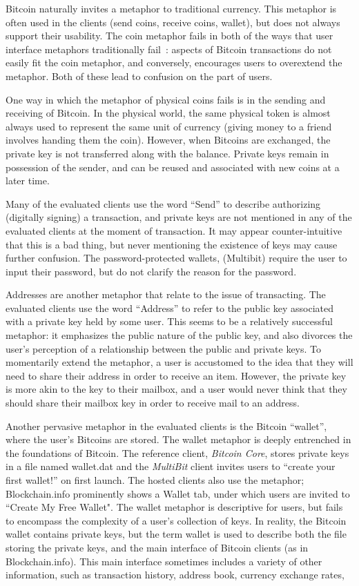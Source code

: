 Bitcoin naturally invites a metaphor to traditional currency. This metaphor is often used in the clients (\eg send coins, receive coins, wallet), but does not always support their usability. The coin metaphor fails in both of the ways that user interface metaphors traditionally fail~\cite{metaphorpaper}: aspects of Bitcoin transactions do not easily fit the coin metaphor, and conversely, encourages users to overextend the metaphor. Both of these lead to confusion on the part of users.   

One way in which the metaphor of physical coins fails is in the sending and receiving of Bitcoin. In the physical world, the same physical token is almost always used to represent the same unit of currency (\ie giving money to a friend involves handing them the coin). However, when Bitcoins are exchanged, the private key is not transferred along with the balance. Private keys remain in possession of the sender, and can be reused and associated with new coins at a later time. 

Many of the evaluated clients use the word ``Send'' to describe authorizing (digitally signing) a transaction, and private keys are not mentioned in any of the evaluated clients at the moment of transaction. It may appear counter-intuitive that this is a bad thing, but never mentioning the existence of keys may cause further confusion. The password-protected wallets, (\eg Multibit) require the user to input their password, but do not clarify the reason for the password.

Addresses are another metaphor that relate to the issue of transacting. The evaluated clients use the word ``Address'' to refer to the public key associated with a private key held by some user. This seems to be a relatively successful metaphor: it emphasizes the public nature of the public key, and also divorces the user's perception of a relationship between the public and private keys. To momentarily extend the metaphor, a user is accustomed to the idea that they will need to share their address in order to receive an item. However, the private key is more akin to the key to their mailbox, and a user would never think that they should share their mailbox key in order to receive mail to an address. 

Another pervasive metaphor in the evaluated clients is the Bitcoin ``wallet'', where the user's Bitcoins are stored. The wallet metaphor is deeply entrenched in the foundations of Bitcoin. The reference client, \emph{Bitcoin Core}, stores private keys in a file named wallet.dat and the \emph{MultiBit} client invites users to ``create your first wallet!'' on first launch. The hosted clients also use the metaphor; Blockchain.info prominently shows a Wallet tab, under which users are invited to ``Create My Free Wallet". The wallet metaphor is descriptive for users, but fails to encompass the complexity of a user's collection of keys. In reality, the Bitcoin wallet contains private keys, but the term wallet is used to describe both the file storing the private keys, and the main interface of Bitcoin clients (as in Blockchain.info). This main interface sometimes includes a variety of other information, such as transaction history, address book, currency exchange rates, \etc


